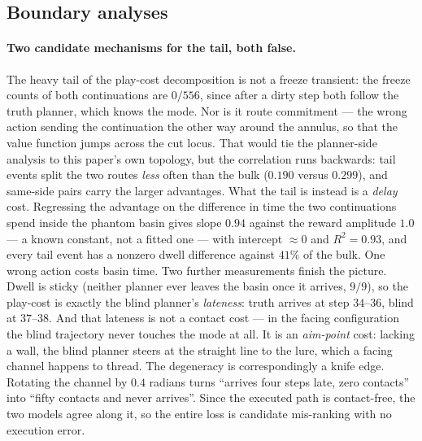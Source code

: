 \documentclass[11pt]{article}
\theoremstyle{remark}
\begin{document}
\subsection{Boundary analyses}

\paragraph{Two candidate mechanisms for the tail, both false.} The heavy
tail of the play-cost decomposition is not a freeze transient: the freeze
counts of both continuations are $0/556$, since after a dirty step both
follow the truth planner, which knows the mode. Nor is it route
commitment --- the wrong action sending the continuation the other way
around the annulus, so that the value function jumps across the cut
locus. That would tie the planner-side analysis to this paper's own
topology, but the correlation runs backwards: tail events split the two
routes \emph{less} often than the bulk ($0.190$ versus $0.299$), and
same-side pairs carry the larger advantages. What the tail is instead is
a \emph{delay} cost. Regressing the advantage on the difference in time
the two continuations spend inside the phantom basin gives slope
$0.94$ against the reward amplitude $1.0$ --- a known constant, not a
fitted one --- with intercept $\approx 0$ and $R^2 = 0.93$, and every
tail event has a nonzero dwell difference against $41\%$ of the bulk.
One wrong action costs basin time. Two further measurements finish the
picture. Dwell is sticky (neither planner ever leaves the basin once it
arrives, $9/9$), so the play-cost is exactly the blind planner's
\emph{lateness}: truth arrives at step $34$--$36$, blind at $37$--$38$.
And that lateness is not a contact cost --- in the facing configuration
the blind trajectory never touches the mode at all. It is an
\emph{aim-point} cost: lacking a wall, the blind planner steers at the
straight line to the lure, which a facing channel happens to thread.
The degeneracy is correspondingly a knife edge. Rotating the channel by
$0.4$ radians turns ``arrives four steps late, zero contacts'' into
``fifty contacts and never arrives''. Since the executed path is
contact-free, the two models agree along it, so the entire loss is
candidate mis-ranking with no execution error.
\end{document}
